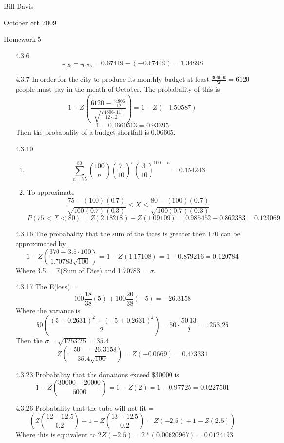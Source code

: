 \documentclass[11pt,fleqn]{article}
\begin{document}
\newcommand{\mbf}[1]{\mbox{{\bfseries #1}}}
\newcommand{\N}{\mbf{N}}
\renewcommand{\O}{\mbf{O}}
\newcommand{\tabfrac}[2]{%
	\setlength{\fboxrule}{0pt}%
	\fbox{$\frac{#1}{#2}$}%
}

\noindent Bill Davis 

\noindent October 8th 2009 

\noindent Homework 5

\begin{enumerate}
  \item[4.3.6]
  \[
  z_{.25} - z_{0.75} = 0.67449 - (-0.67449) = 1.34898
 \]

  \item[4.3.7]
  In order for the city to produce its monthly budget at least
  $\frac{306000}{50}=6120$ people must pay in the month of October. The
  probabality of this is 
  \[
  1- Z(\frac{6120 - \frac{74806}{12}}{\sqrt{\frac{74806\cdot 11}{12 \cdot
  12}}}) = 1- Z(-1.50587)
  \]
  \[
	1-0.0660503 = 0.93395  
  \]
  Then the probabality of a budget shortfall is 0.06605. 
  \item[4.3.10]
  \begin{enumerate}
      \item 
      	\[
\sum_{n=75}^{80} {100 \choose n}\left(\frac{7}{10}\right)^n
\left(\frac{3}{10}\right)^{100-n} = 0.154243
      	\]
      \item
      	To approximate 
      	\[
      	\frac{75-(100)(0.7)}{\sqrt{100(0.7)(0.3)}} \leq X \leq
      	\frac{80-(100)(0.7)}{\sqrt{100(0.7)(0.3)}}
      	\]
      	\[
      	P(75<X<80) = Z(2.18218) - Z(1.09109)  = 0.985452 -0.862383 = 0.123069
      	\]
  \end{enumerate}
  \item[4.3.16]
  The probabality that the sum of the faces is greater then 170 can be
  approximated by 
  \[
  1 - Z(\frac{370-3.5 \cdot 100}{1.70783\sqrt{100}}) = 1-Z(1.17108) = 
  1-0.879216 = 0.120784
  \]
  Where 3.5 = E(Sum of Dice) and 1.70783 = $\sigma$. 
  \item[4.3.17]
  The E(loss) = 
  \[
  100 \frac{18}{38}(5) + 100\frac{20}{38}(-5) = -26.3158
  \]
  Where the variance is 
  \[
  50(\frac{(5+0.2631)^2 + (-5+0.2631)^2}{2}) = 50 \cdot \frac{50.13}{2} =
  1253.25
  \]
  Then the $\sigma = \sqrt{1253.25} = 35.4$
  \[
  Z(\frac{-50 - -26.3158}{35.4 \sqrt{100}}) = Z(-0.0669) = 0.473331
  \] 
  
  \item[4.3.23]
  Probabality that the donations exceed \$30000 is 
  \[
  1-Z(\frac{30000-20000}{5000}) = 1-Z(2) = 1-0.97725=0.0227501 
  \]
  \item[4.3.26]
  Probabality that the tube will not fit = 
  \[
  ( Z(\frac{12-12.5}{0.2}) + 1-Z(\frac{13-12.5}{0.2}) = Z(-2.5) + 1-Z(2.5) )
  \]
  Where this is equivalent to $2Z(-2.5) = 2*(0.00620967) = 0.0124193	$
  

\end{enumerate}
\end{document}
